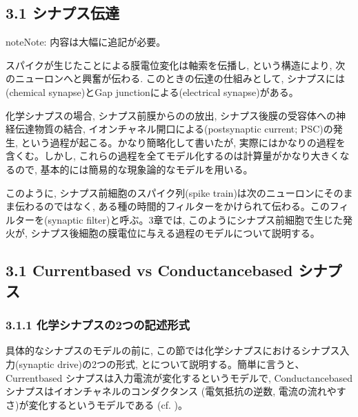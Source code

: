 \documentclass[letterpaper,10pt,english]{sphinxmanual}
\begin{document}
\subsection{3.1 シナプス伝達}
\label{\detokenize{3-1_synapse:id1}}\label{\detokenize{3-1_synapse::doc}}
\begin{sphinxadmonition}{note}{Note:}
内容は大幅に追記が必要。
\end{sphinxadmonition}

スパイクが生じたことによる膜電位変化は軸索を伝播し, という構造により, 次のニューロンへと興奮が伝わる. このときの伝達の仕組みとして, シナプスには(chemical synapse)とGap junctionによる(electrical synapse)がある。

化学シナプスの場合, シナプス前膜からのの放出, シナプス後膜の受容体への神経伝達物質の結合, イオンチャネル開口による(postsynaptic current; PSC)の発生, という過程が起こる。かなり簡略化して書いたが, 実際にはかなりの過程を含くむ。しかし, これらの過程を全てモデル化するのは計算量がかなり大きくなるので, 基本的には簡易的な現象論的なモデルを用いる。

このように, シナプス前細胞のスパイク列(spike train)は次のニューロンにそのまま伝わるのではなく, ある種の時間的フィルターをかけられて伝わる。このフィルターを(synaptic filter)と呼ぶ。3章では, このようにシナプス前細胞で生じた発火が, シナプス後細胞の膜電位に与える過程のモデルについて説明する。


\subsection{3.1 Current\sphinxhyphen{}based vs Conductance\sphinxhyphen{}based シナプス}
\label{\detokenize{3-2_current-conductance-synapse:current-based-vs-conductance-based}}\label{\detokenize{3-2_current-conductance-synapse::doc}}

\subsubsection{3.1.1 化学シナプスの2つの記述形式}
\label{\detokenize{3-2_current-conductance-synapse:id1}}
具体的なシナプスのモデルの前に, この節では化学シナプスにおけるシナプス入力(synaptic drive)の2つの形式, とについて説明する。簡単に言うと、Current\sphinxhyphen{}based シナプスは入力電流が変化するというモデルで, Conductance\sphinxhyphen{}based シナプスはイオンチャネルのコンダクタンス (電気抵抗の逆数, 電流の流れやすさ)が変化するというモデルである (cf. )。
\end{document}
